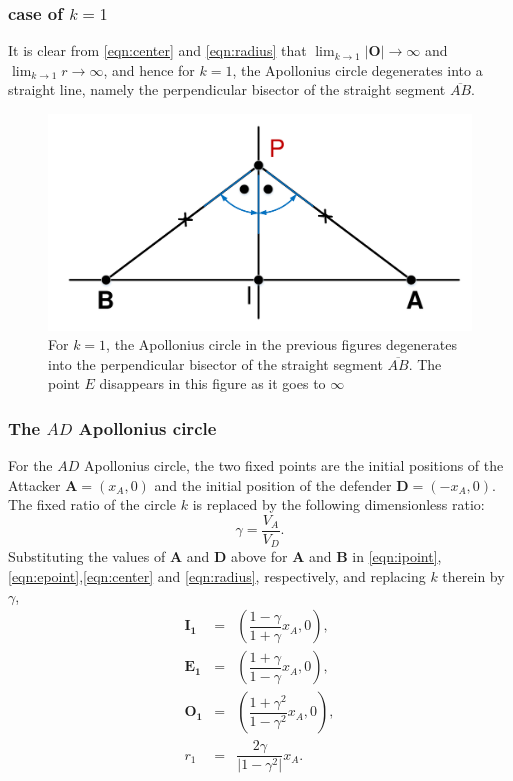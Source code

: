 \documentclass{beamer}
\begin{document}
\begin{frame}
\frametitle{case of $k=1$}
It is clear from \eqref{eqn:center} and \eqref{eqn:radius} that $\lim_{k\to1}\lvert\boldsymbol{O}\rvert\to\infty$ and $\lim_{k\to1}r\to\infty$, and hence for $k=1$, the Apollonius circle degenerates into a straight line, namely the perpendicular bisector of the straight segment $\overline{AB}$.

\begin{figure}[htb]
\centering
\includegraphics[scale = 0.3]{fig/drawing3.pdf}
\caption{For $k=1$, the Apollonius circle in the previous figures degenerates into the perpendicular bisector of the straight segment $\overline{AB}$. The point $E$ disappears in this figure as it goes to $\infty$  }
\label{3}
\end{figure}
\end{frame}
\begin{frame} 
\frametitle{The $AD$ Apollonius circle}
For the $AD$ Apollonius circle, the two fixed points are the initial positions of the Attacker $\boldsymbol{A}=(x_{A},0)$ and the initial position of the defender $\boldsymbol{D}=(-x_{A},0)$. The fixed ratio of the circle $k$ is replaced by the following dimensionless ratio: 
\begin{equation}
\gamma = \dfrac{V_{A}}{V_{D}}.
\end{equation}
Substituting the values of $\boldsymbol{A}$ and $\boldsymbol{D}$ above for $\boldsymbol{A}$ and $\boldsymbol{B}$ in \eqref{eqn:ipoint},\eqref{eqn:epoint},\eqref{eqn:center} and \eqref{eqn:radius}, respectively, and replacing $k$ therein by $\gamma$,
\begin{eqnarray}
\boldsymbol{I_{1}} &=& (\dfrac{1-\gamma}{1+\gamma}x_{A},0),\\
\boldsymbol{E_{1}} &=& (\dfrac{1+\gamma}{1-\gamma}x_{A},0),\\
\boldsymbol{O_{1}} &=& (\dfrac{1+\gamma^{2}}{1-\gamma^{2}}x_{A},0),\\
\label{O1}
r_{1} &=& \dfrac{2\gamma}{\lvert1-\gamma^{2}\rvert}x_{A}.
\label{r1}
\end{eqnarray}
\end{frame}
\end{document}
